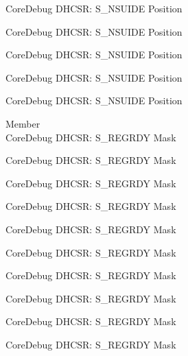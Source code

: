 \begin{DoxyRefList}
\label{deprecated__deprecated000468}%
%
Core\+Debug DHCSR\+: S\+\_\+\+NSUIDE Position 

\label{deprecated__deprecated000570}%
%
Core\+Debug DHCSR\+: S\+\_\+\+NSUIDE Position 

\label{deprecated__deprecated000676}%
%
Core\+Debug DHCSR\+: S\+\_\+\+NSUIDE Position 

\label{deprecated__deprecated001127}%
%
Core\+Debug DHCSR\+: S\+\_\+\+NSUIDE Position 

\label{deprecated__deprecated001229}%
%
Core\+Debug DHCSR\+: S\+\_\+\+NSUIDE Position  
\item[Member \doxylink{group___c_m_s_i_s___core_debug_gac4cd6f3178de48f473d8903e8c847c07}{Core\+Debug\+\_\+\+DHCSR\+\_\+\+S\+\_\+\+REGRDY\+\_\+\+Msk} ]\hfill \\
\label{deprecated__deprecated000028}%
%
Core\+Debug DHCSR\+: S\+\_\+\+REGRDY Mask 

\label{deprecated__deprecated000120}%
%
Core\+Debug DHCSR\+: S\+\_\+\+REGRDY Mask 

\label{deprecated__deprecated000174}%
%
Core\+Debug DHCSR\+: S\+\_\+\+REGRDY Mask 

\label{deprecated__deprecated000259}%
%
Core\+Debug DHCSR\+: S\+\_\+\+REGRDY Mask 

\label{deprecated__deprecated000316}%
%
Core\+Debug DHCSR\+: S\+\_\+\+REGRDY Mask 

\label{deprecated__deprecated000392}%
%
Core\+Debug DHCSR\+: S\+\_\+\+REGRDY Mask 

\label{deprecated__deprecated000479}%
%
Core\+Debug DHCSR\+: S\+\_\+\+REGRDY Mask 

\label{deprecated__deprecated000581}%
%
Core\+Debug DHCSR\+: S\+\_\+\+REGRDY Mask 

\label{deprecated__deprecated000687}%
%
Core\+Debug DHCSR\+: S\+\_\+\+REGRDY Mask 

\label{deprecated__deprecated000779}%
%
Core\+Debug DHCSR\+: S\+\_\+\+REGRDY Mask 


\end{DoxyRefList}
